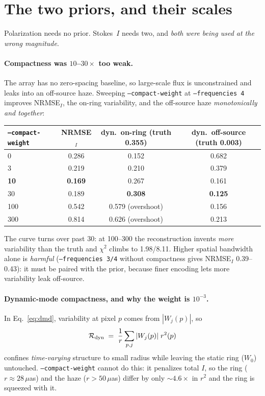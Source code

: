\documentclass[11pt]{article}
\begin{document}
\section{The two priors, and their scales}
\label{sec:dyn}

Polarization needs no prior. Stokes~$I$ needs two, and \emph{both were being used at
the wrong magnitude}.

\paragraph{Compactness was $10$--$30\times$ too weak.} The array has no zero-spacing
baseline, so large-scale flux is unconstrained and leaks into an off-source haze.
Sweeping \texttt{--compact-weight} at \texttt{--frequencies 4} improves NRMSE$_I$, the
on-ring variability, and the off-source haze \emph{monotonically and together}:
\begin{center}
\begin{tabular}{@{}lccc@{}}
\toprule
\texttt{--compact-weight} & NRMSE$_I$ & dyn.\ on-ring (truth 0.355) & dyn.\ off-source (truth 0.003) \\
\midrule
0    & 0.286 & 0.152 & 0.682 \\
3    & 0.219 & 0.210 & 0.379 \\
\textbf{10}   & \textbf{0.169} & 0.267 & 0.161 \\
30   & 0.189 & \textbf{0.308} & \textbf{0.125} \\
100  & 0.542 & 0.579 (overshoot) & 0.156 \\
300  & 0.814 & 0.626 (overshoot) & 0.213 \\
\bottomrule
\end{tabular}
\end{center}
The curve turns over past 30: at 100--300 the reconstruction invents \emph{more}
variability than the truth and $\chi^2$ climbs to 1.98/8.11. Higher spatial bandwidth
alone is \emph{harmful} (\texttt{--frequencies 3/4} without compactness gives
NRMSE$_I$ 0.39--0.43): it must be paired with the prior, because finer encoding lets
more variability leak off-source.

\paragraph{Dynamic-mode compactness, and why the weight is $10^{-3}$.} In
Eq.~\ref{eq:dmd}, variability at pixel $p$ comes from $|W_j(p)|$, so
\begin{equation}
  \mathcal{R}_{\rm dyn} \;=\; \frac{1}{r}\sum_{p,j} |W_j(p)|\;r^2(p)
\end{equation}
confines \emph{time-varying} structure to small radius while leaving the static ring
($W_0$) untouched. \texttt{--compact-weight} cannot do this: it penalizes total $I$, so
the ring ($r\!\approx\!28\,\mu$as) and the haze ($r\!>\!50\,\mu$as) differ by only
${\sim}4.6\times$ in $r^2$ and the ring is squeezed with it.
\end{document}
